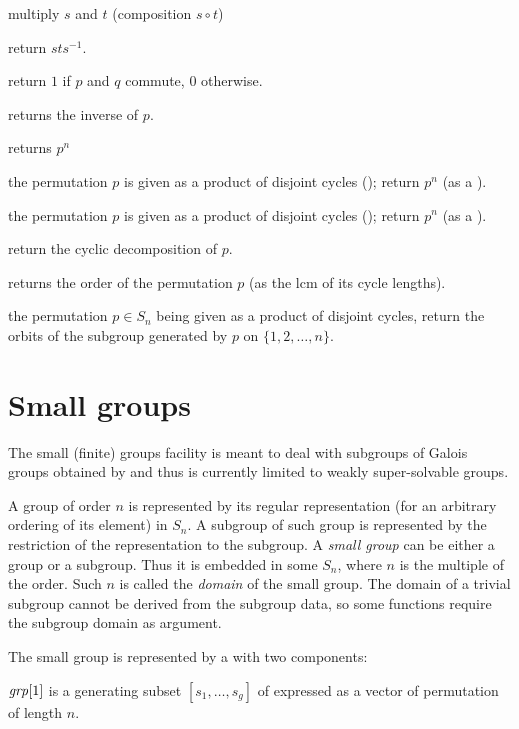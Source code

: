  multiply $s$ and $t$ (composition $s\circ t$)

 return $sts^{-1}$.

 return $1$ if $p$ and $q$ commute, 0
otherwise.

 returns the inverse of $p$.

 returns $p^n$

 the permutation $p$ is given as
a product of disjoint cycles (); return $p^n$ (as a ).

 the permutation $p$ is given as
a product of disjoint cycles (); return $p^n$ (as a ).

 return the cyclic decomposition of $p$.

 returns the order of the permutation $p$
(as the lcm of its cycle lengths).

 the permutation $p\in S_n$ being
given as a product of disjoint cycles, return the orbits of the subgroup
generated by $p$ on $\{1,2,\ldots,n\}$.

\section{Small groups}

The small (finite) groups facility is meant to deal with subgroups of Galois
groups obtained by  and thus is currently limited to weakly
super-solvable groups.

A group  of order $n$ is represented by its regular representation
(for an arbitrary ordering of its element) in $S_n$.  A subgroup of such group
is represented by the restriction of the representation to the subgroup.
A \emph{small group} can be either a group or a subgroup. Thus it is embedded
in some $S_n$, where $n$ is the multiple of the order. Such $n$ is called the
\emph{domain} of the small group. The domain of a trivial subgroup cannot be
derived from the subgroup data, so some functions require the subgroup domain
as argument.

The small group  is represented by a  with two
components:

$\hbox{\it grp\/}[1]$ is a generating subset $[s_1,\ldots,s_g]$ of 
expressed as a vector of permutation of length $n$.

